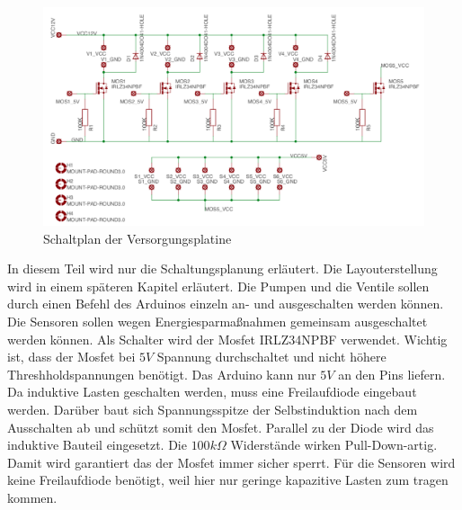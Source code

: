 \begin{figure}[ht]
    \centering
    \includegraphics[width=\textwidth]{silas/versorgung1}
    \caption{Schaltplan der Versorgungsplatine}
\end{figure}

In diesem Teil wird nur die Schaltungsplanung erläutert. Die Layouterstellung wird in einem
späteren Kapitel erläutert.
Die Pumpen und die Ventile sollen durch einen Befehl des Arduinos einzeln an- und ausgeschalten
werden können. Die Sensoren sollen wegen Energiesparmaßnahmen gemeinsam ausgeschaltet werden können.
Als Schalter wird der Mosfet IRLZ34NPBF verwendet. Wichtig
ist, dass der Mosfet bei $5V$ Spannung durchschaltet und nicht höhere Threshholdspannungen benötigt.
Das Arduino kann nur $5V$ an den Pins liefern. Da induktive Lasten geschalten werden, muss eine
Freilaufdiode eingebaut werden. Darüber
baut sich Spannungsspitze der Selbstinduktion nach dem Ausschalten ab und schützt somit den Mosfet.
Parallel zu der Diode wird das induktive Bauteil eingesetzt. Die $100k\Omega$ Widerstände wirken
Pull-Down-artig. Damit wird garantiert das
der Mosfet immer sicher sperrt. Für die Sensoren wird keine Freilaufdiode benötigt,
weil hier nur geringe kapazitive Lasten zum tragen kommen.

